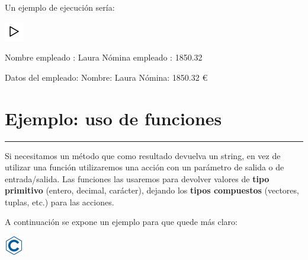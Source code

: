 \documentclass[
]{book}
\newenvironment{Shaded}{\begin{snugshade}}{\end{snugshade}}
\newcommand{\FloatTok}[1]{\textcolor[rgb]{0.00,0.00,0.81}{#1}}
\newcommand{\NormalTok}[1]{#1}
\begin{document}
Un ejemplo de ejecución sería:

\includegraphics{./img/play.png}

\begin{Shaded}
\begin{Highlighting}[]
\NormalTok{Nombre empleado : Laura}
\NormalTok{Nómina empleado : }\FloatTok{1850.32}

\NormalTok{Datos del empleado: }
\NormalTok{    Nombre: Laura}
\NormalTok{    Nómina: }\FloatTok{1850.32}\NormalTok{ €}
\end{Highlighting}
\end{Shaded}

\hypertarget{ejemplo-uso-de-funciones}{%
\section{Ejemplo: uso de funciones}\label{ejemplo-uso-de-funciones}}

\begin{center}\rule{0.5\linewidth}{0.5pt}\end{center}

Si necesitamos un método que como resultado devuelva un string, en vez de utilizar una función utilizaremos una acción con un parámetro de salida o de entrada/salida. Las funciones las usaremos para devolver valores de \textbf{tipo primitivo} (entero, decimal, carácter), dejando los \textbf{tipos compuestos} (vectores, tuplas, etc.) para las acciones.

A continuación se expone un ejemplo para que quede más claro:

\includegraphics{./img/c.png}
\end{document}
